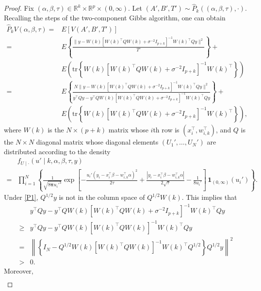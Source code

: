 \documentclass[12pt]{article}
\newcommand{\ind}{\mathbf{1}}
\begin{document}
\begin{proof}
	Fix $(\alpha, \beta, \tau) \in \mathbb{R}^k \times \mathbb{R}^p \times (0,\infty)$.
	Let $(A',B',T') \sim \hat{P}_k((\alpha, \beta, \tau), \cdot)$.
	Recalling the steps of the two-component Gibbs algorithm, one can obtain
	\[
	\begin{aligned}
		\hat{P}_k V(\alpha, \beta, \tau) =& E \left[ V(A',B',T') \right] \\
		=& E\left\{ \frac{\|y - W(k) [W(k)^{\top} Q W(k) + \sigma^{-2} I_{p+k} ]^{-1} W(k)^{\top} Q y \|^2 }{T'} \right\} + \\
		& E \left( \mbox{tr} \left\{ W(k) [W(k)^{\top} Q W(k) + \sigma^{-2} I_{p+k} ]^{-1} W(k)^{\top} \right\} \right) \\
		=& E\left\{ \frac{N \| y -  W(k) [W(k)^{\top} Q W(k) + \sigma^{-2} I_{p+k} ]^{-1} W(k)^{\top} Q y \|^2 }{ y^{\top} Q y - y^{\top} Q W(k) [W(k)^{\top} Q W(k) + \sigma^{-2} I_{p+k}]^{-1} W(k)^{\top} Q y } \right\} + \\
		& E \left( \mbox{tr} \left\{ W(k) [W(k)^{\top} Q W(k) + \sigma^{-2} I_{p+k} ]^{-1} W(k)^{\top} \right\} \right),
	\end{aligned}
	\]
	where $W(k)$ is the $N \times (p+k)$ matrix whose $i$th row is $(x_i^{\top}, w_{i,k}^{\top})$, and $Q$ is the $N \times N$ diagonal matrix whose diagonal elements $(U_1',\dots, U_N')$ are distributed according to the density 
	\[
	\begin{aligned}
		&f_{U \mid \cdot}(u' \mid k, \alpha, \beta, \tau, y) \\
		=& \prod_{i=1}^N \left\{ \frac{1}{\sqrt{8\bm{\pi} u_i'^3}} \exp \left[ -  \frac{u_i' (y_i - x_i^{\top} \beta - w_{i,k}^{\top} \alpha )^2}{2\tau} + \frac{|y_i - x_i^{\top} \beta - w_{i,k}^{\top} \alpha|}{2\sqrt{\tau}}  - \frac{1}{8u_i'} \right]  \, \ind_{(0,\infty)}(u_i') \right\}.
	\end{aligned}
	\]
	Under \ref{P1}, $Q^{1/2} y$ is not in the column space of $Q^{1/2} W(k)$.
	This implies that
	\[
	\begin{aligned}
		& y^{\top} Q y - y^{\top} Q W(k) [W(k)^{\top} Q W(k) + \sigma^{-2} I_{p+k}]^{-1} W(k)^{\top} Q y \\
		\geq & y^{\top} Q y - y^{\top} Q W(k) [W(k)^{\top} Q W(k) ]^{-1} W(k)^{\top} Q y \\
		=& \left\| \left\{ I_N -  Q^{1/2} W(k) [W(k)^{\top} Q W(k)]^{-1} W(k)^{\top} Q^{1/2} \right\} Q^{1/2} y \right\|^2 \\
		>& 0.
	\end{aligned}
	\]
	Moreover,
	\[
	\begin{aligned}

\end{aligned}\]
\end{proof}
\end{document}

